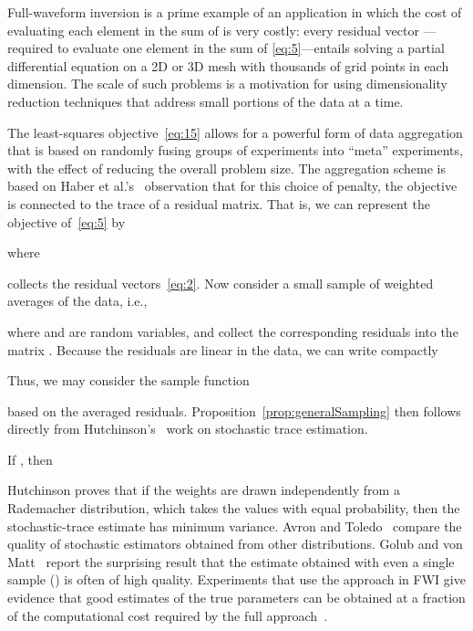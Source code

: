 \documentclass[nospthms]{svjour3}
\numberwithin{equation}{section}
\begin{document}
Full-waveform inversion is a prime example of an application in which
the cost of evaluating each element in the sum of  is very
costly: every residual vector ---required to evaluate one
element in the sum of \eqref{eq:5}---entails solving a partial
differential equation on a 2D or 3D mesh with thousands of grid points
in each dimension.  The scale of such problems is a motivation for
using dimensionality reduction techniques that address small portions
of the data at a time.

The least-squares objective~\eqref{eq:15} allows for a powerful form
of data aggregation that is based on randomly fusing groups of
experiments into ``meta'' experiments, with the effect of
reducing the overall problem size. The aggregation scheme is based on Haber et
al.'s~\cite{haber10} observation that for this choice of penalty, the
objective is connected to the trace of a residual matrix. That is, we can
represent the objective of~\eqref{eq:5} by

where

collects the residual vectors~\eqref{eq:2}. Now consider a small
sample of  weighted averages of the data, i.e.,

where  and  are random variables, and collect the
corresponding  residuals 
into the matrix . Because the residuals are linear in the data, we can
write compactly

Thus, we may consider the sample function

based on the  averaged residuals.
Proposition~\ref{prop:generalSampling} then follows directly from
Hutchinson's~\cite[\S2]{Hutchinson:1990} work on stochastic trace
estimation.
\begin{bproposition}
\label{prop:generalSampling}
If , then

\end{bproposition}

Hutchinson proves that if the weights  are drawn independently
from a Rademacher distribution, which takes the values  with
equal probability, then the stochastic-trace estimate has minimum
variance. Avron and Toledo~\cite{AvronToledo:2011} compare the quality
of stochastic estimators obtained from other distributions. Golub and
von Matt~\cite{GoluMatt:1991} report the surprising result that the
estimate obtained with even a single sample () is often of high
quality. Experiments that use the approach in FWI give evidence that
good estimates of the true parameters can be obtained at a fraction of
the computational cost required by the full
approach~\cite{Krebs09,leeuwen2011,HFY:2011}.
\end{document}
